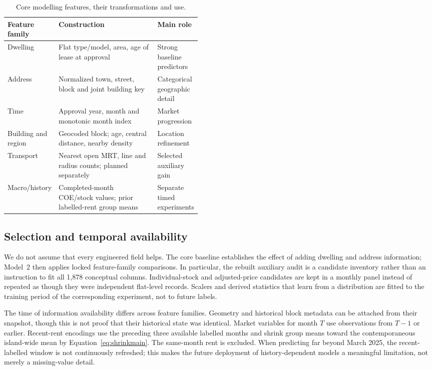 \documentclass[10pt,a4paper]{article}
\begin{document}
\begin{table}[htbp]\centering\small
\caption{Core modelling features, their transformations and use.}\label{tab:featurepipeline}
\begin{tabularx}{\linewidth}{@{}p{0.23\linewidth}X p{0.22\linewidth}@{}}\toprule
Feature family & Construction & Main role\\\midrule
Dwelling & Flat type/model, area, age of lease at approval & Strong baseline predictors\\
Address & Normalized town, street, block and joint building key & Categorical geographic detail\\
Time & Approval year, month and monotonic month index & Market progression\\
Building and region & Geocoded block; age, central distance, nearby density & Location refinement\\
Transport & Nearest open MRT, line and radius counts; planned separately & Selected auxiliary gain\\
Macro/history & Completed-month COE/stock values; prior labelled-rent group means & Separate timed experiments\\\bottomrule
\end{tabularx}\end{table}

\subsection{Selection and temporal availability}
We do not assume that every engineered field helps. The core baseline establishes the effect of adding dwelling and address information; Model~2 then applies locked feature-family comparisons. In particular, the rebuilt auxiliary audit is a candidate inventory rather than an instruction to fit all 1,878 conceptual columns. Individual-stock and adjusted-price candidates are kept in a monthly panel instead of repeated as though they were independent flat-level records. Scalers and derived statistics that learn from a distribution are fitted to the training period of the corresponding experiment, not to future labels.

The time of information availability differs across feature families. Geometry and historical block metadata can be attached from their snapshot, though this is not proof that their historical state was identical. Market variables for month $T$ use observations from $T-1$ or earlier. Recent-rent encodings use the preceding three available labelled months and shrink group means toward the contemporaneous island-wide mean by Equation~\eqref{eq:shrinkmain}. The same-month rent is excluded. When predicting far beyond March 2025, the recent-labelled window is not continuously refreshed; this makes the future deployment of history-dependent models a meaningful limitation, not merely a missing-value detail.
\end{document}

